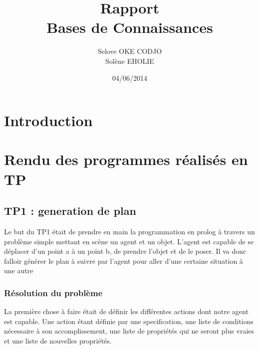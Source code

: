 \documentclass[a4paper,10pt]{article}
\title{Rapport \\ Bases de Connaissances}
\author{Selove OKE CODJO \\ Solène EHOLIE}
\date{04/06/2014}
\begin{document}
 \maketitle
 \newpage
 \tableofcontents
 \newpage
 \section{Introduction}
 
 
 \section{Rendu des programmes r\'{e}alis\'{e}s en TP}
 
  \subsection{TP1 : generation de plan}
  
  Le but du TP1 était de prendre en main la programmation en prolog \`{a} travers un problème simple mettant en scène un agent et un objet. L'agent
  est capable de se d\'{e}placer d'un point a \`{a} un point b, de prendre l'objet et de le poser. Il va donc falloir g\'{e}n\'{e}rer le plan \`{a}
  suivre par l'agent pour aller d'une certaine situation \`{a} une autre
  
  
   \subsubsection{R\'{e}solution du probl\`{e}me}
  La premi\`{e}re chose \`{a} faire \'{e}tait de d\'{e}finir les diff\'{e}rentes actions dont notre agent est capable.
  Une action \'{e}tant d\'{e}finie par une specification, une liste de conditions n\'{e}cessaire \`{a} son accomplissement, une liste de propri\'{e}t\'{e}s qui ne seront
  plus vraies et une liste de nouvelles propri\'{e}t\'{e}s.
  
\end{document}
